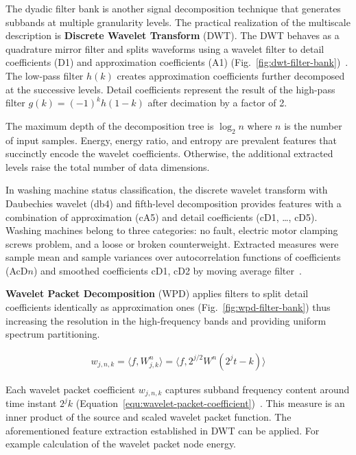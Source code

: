 The dyadic filter bank is another signal decomposition technique that generates subbands at multiple granularity levels. The practical realization of the multiscale description is \textbf{Discrete Wavelet Transform} (DWT). The DWT behaves as a quadrature mirror filter and splits waveforms using a wavelet filter to detail coefficients (D1) and approximation coefficients (A1) (Fig.~\ref{fig:dwt-filter-bank})~\cite{nandi_condition_2019}. The low-pass filter $h(k)$ creates approximation coefficients further decomposed at the successive levels. Detail coefficients represent the result of the high-pass filter $g(k) = (-1)^k h(1 - k)$ after decimation by a factor of 2. 

The maximum depth of the decomposition tree is $\log_2{n}$ where $n$ is the number of input samples. Energy, energy ratio, and entropy are prevalent features that succinctly encode the wavelet coefficients. Otherwise, the additional extracted levels raise the total number of data dimensions.

In washing machine status classification, the discrete wavelet transform with Daubechies wavelet (db4) and fifth-level decomposition provides features with a combination of approximation (cA5) and detail coefficients (cD1, \dots, cD5). Washing machines belong to three categories: no fault, electric motor clamping screws problem, and a loose or broken counterweight. Extracted measures were sample mean and sample variances over autocorrelation functions of coefficients (AcD$n$) and smoothed coefficients cD1, cD2 by moving average filter~\cite{goumas_classification_2002}.

\textbf{Wavelet Packet Decomposition} (WPD) applies filters to split detail coefficients identically as approximation ones (Fig.~\ref{fig:wpd-filter-bank}) thus increasing the resolution in the high-frequency bands and providing uniform spectrum partitioning. 

\begin{ceqn}\begin{align}
 w_{j,n,k} = \langle f, W_{j,k}^n\rangle = \langle f, 2^{j/2} W^n (2^jt-k) \rangle
\label{equ:wavelet-packet-coefficient}
\end{align}\end{ceqn}

Each wavelet packet coefficient $w_{j,n,k}$ captures subband frequency content around time instant $2^j k$ (Equation~\ref{equ:wavelet-packet-coefficient})~\cite{yen_wavelet_2000}. This measure is an inner product of the source and scaled wavelet packet function. The aforementioned feature extraction established in DWT can be applied. For example calculation of the wavelet packet node energy.

